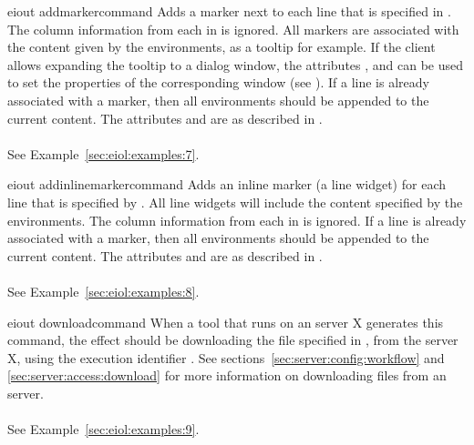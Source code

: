 \bigskip
\xmlstruct
{eiout}
{addmarkercommand}
{%
%
  Adds a marker next to each line that is specified in
  . The column information from each
   in  is
  ignored.  All markers are associated with the content given by the
   environments, as a tooltip for
  example. If the client allows expanding the tooltip to a dialog
  window, the attributes ,
   and  can be used
  to set the properties of the corresponding window (see
  ).
%
  If a line is already associated with a marker, then all
   environments should be appended to the
  current content.
%
  The attributes  and  are
  as described in .
%
  \\\\See Example~\ref{sec:eiol:examples:7}.
}

\bigskip
\xmlstruct
{eiout}
{addinlinemarkercommand}
{%
%
  Adds an inline marker (a line widget) for each line that is
  specified by . All line widgets will
  include the content specified by the 
  environments. The column information from each
   in  is
  ignored.
%
  If a line is already associated with a marker, then all
   environments should be appended to the
  current content.
%
  The attributes  and  are
  as described in .
%
  \\\\See Example~\ref{sec:eiol:examples:8}.
}


\bigskip
\xmlstruct
{eiout}
{downloadcommand}
{%
%
  When a tool that runs on an \ei server X generates this command, the
  effect should be downloading the file specified in
  , from the \ei server X, using the execution
  identifier . See
  sections~\ref{sec:server:config:workflow} and
  \ref{sec:server:access:download} for more information on downloading
  files from an \ei server.
%
  \\\\See Example~\ref{sec:eiol:examples:9}.
}

